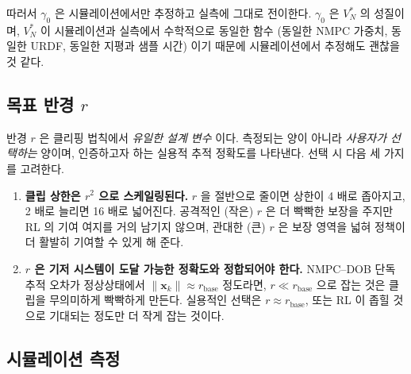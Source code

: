 \documentclass[
  11pt,
]{article}
\theoremstyle{plain}
\theoremstyle{plain}
\theoremstyle{definition}
\theoremstyle{remark}
\begin{document}
\begin{tcolorbox}[enhanced jigsaw, arc=.35mm, bottomrule=.15mm, bottomtitle=1mm, breakable, colback=white, colbacktitle=quarto-callout-tip-color!10!white, colframe=quarto-callout-tip-color-frame, coltitle=black, left=2mm, leftrule=.75mm, opacityback=0, opacitybacktitle=0.6, rightrule=.15mm, title=\textcolor{quarto-callout-tip-color}{\faLightbulb}\hspace{0.5em}{Tip}, titlerule=0mm, toprule=.15mm, toptitle=1mm]

따러서 \(\gamma_0\) 은 시뮬레이션에서만 추정하고 실측에 그대로 전이한다.
\(\gamma_0\) 은 \(V_N^*\) 의 성질이며, \(V_N^*\) 이 시뮬레이션과
실측에서 수학적으로 동일한 함수 (동일한 NMPC 가중치, 동일한 URDF, 동일한
지평과 샘플 시간) 이기 때문에 시뮬레이션에서 추정해도 괜찮을것 같다.

\end{tcolorbox}

\subsection{\texorpdfstring{목표 반경
\(r\)}{목표 반경 r}}\label{sec-estim-r}

반경 \(r\) 은 클리핑 법칙에서 \emph{유일한 설계 변수} 이다. 측정되는
양이 아니라 \emph{사용자가 선택하는} 양이며, 인증하고자 하는 실용적 추적
정확도를 나타낸다. 선택 시 다음 세 가지를 고려한다.

\begin{enumerate}
\def\labelenumi{\arabic{enumi}.}
\item
  \textbf{클립 상한은 \(r^2\) 으로 스케일링된다.} \(r\) 을 절반으로
  줄이면 상한이 4 배로 좁아지고, 2 배로 늘리면 16 배로 넓어진다.
  공격적인 (작은) \(r\) 은 더 빡빡한 보장을 주지만 RL 의 기여 여지를
  거의 남기지 않으며, 관대한 (큰) \(r\) 은 보장 영역을 넓혀 정책이 더
  활발히 기여할 수 있게 해 준다.
\item
  \textbf{\(r\) 은 기저 시스템이 도달 가능한 정확도와 정합되어야 한다.}
  NMPC--DOB 단독 추적 오차가 정상상태에서
  \(\|\bm{x}_k\| \approx r_{\mathrm{base}}\) 정도라면,
  \(r \ll r_{\mathrm{base}}\) 으로 잡는 것은 클립을 무의미하게 빡빡하게
  만든다. 실용적인 선택은 \(r \approx r_{\mathrm{base}}\), 또는 RL 이
  좁힐 것으로 기대되는 정도만 더 작게 잡는 것이다.
\end{enumerate}

\subsection{시뮬레이션
측정}\label{uxc2dcuxbbacuxb808uxc774uxc158-uxce21uxc815}
\end{document}
